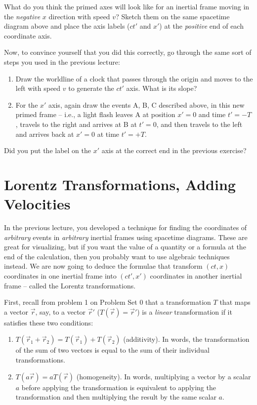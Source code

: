 \documentclass[11pt, letterpaper, openany]{book}
\newenvironment{exercise}[1][Exercise]{%
  \tcolorbox[blanker, breakable, left=1em,
    before skip=1em, after skip=1em,
    borderline west={3pt}{0pt}{PhysNavy},
    colback=PhysCream,
    before upper={\textcolor{PhysNavy}{\sffamily\bfseries #1:}\space}
  ]%
}{%
  \endtcolorbox%
}
\begin{document}
\begin{exercise}[Exercise 12]
What do you think the primed axes will look like for an inertial frame moving in the \textit{negative} $x$ direction with speed $v$? Sketch them on the same spacetime diagram above and place the axis labels ($ct'$ and $x'$) at the \textit{positive} end of each coordinate axis.
\end{exercise}

\begin{exercise}[Exercise 13]
Now, to convince yourself that you did this correctly, go through the same sort of steps you used in the previous lecture:
\begin{enumerate}[label=(\alph*)]
    \item Draw the worldline of a clock that passes through the origin and moves to the left with speed $v$ to generate the $ct'$ axis. What is its slope?
    \item For the $x'$ axis, again draw the events A, B, C described above, in this new primed frame -- i.e., a light flash leaves A at position $x'=0$ and time $t'=-T$, travels to the right and arrives at B at $t'=0$, and then travels to the left and arrives back at $x'=0$ at time $t'=+T$.
\end{enumerate}
Did you put the label on the $x'$ axis at the correct end in the previous exercise?
\end{exercise}

\chapter{Lorentz Transformations, Adding Velocities}

In the previous lecture, you developed a technique for finding the coordinates of \textit{arbitrary} events in \textit{arbitrary} inertial frames using spacetime diagrams. These are great for visualizing, but if you want the value of a quantity or a formula at the end of the calculation, then you probably want to use algebraic techniques instead. We are now going to deduce the formulae that transform $(ct, x)$ coordinates in one inertial frame into $(ct', x')$ coordinates in another inertial frame -- called the Lorentz transformations.

First, recall from problem 1 on Problem Set 0 that a transformation $T$ that maps a vector $\vec{r}$, say, to a vector $\vec{r}'$ ($T(\vec{r}) = \vec{r}'$) is a \textit{linear} transformation if it satisfies these two conditions:
\begin{enumerate}
    \item $T(\vec{r}_1 + \vec{r}_2) = T(\vec{r}_1) + T(\vec{r}_2)$ (additivity). In words, the transformation of the sum of two vectors is equal to the sum of their individual transformations.
    \item $T(a\vec{r}) = aT(\vec{r})$ (homogeneity). In words, multiplying a vector by a scalar $a$ before applying the transformation is equivalent to applying the transformation and then multiplying the result by the same scalar $a$.
\end{enumerate}
\end{document}
